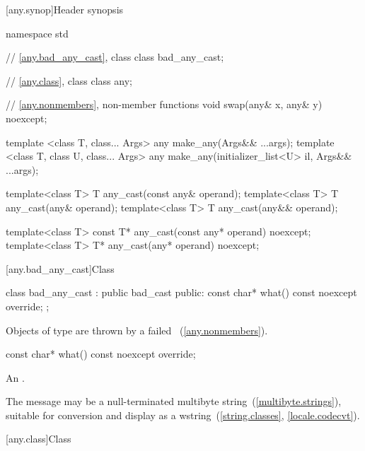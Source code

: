 [any.synop]{Header  synopsis}

%
%

\begin{codeblock}
namespace std {
  // \ref{any.bad_any_cast}, class 
  class bad_any_cast;

  // \ref{any.class}, class 
  class any;

  // \ref{any.nonmembers}, non-member functions
  void swap(any& x, any& y) noexcept;

  template <class T, class... Args>
    any make_any(Args&& ...args);
  template <class T, class U, class... Args>
    any make_any(initializer_list<U> il, Args&& ...args);

  template<class T>
    T any_cast(const any& operand);
  template<class T>
    T any_cast(any& operand);
  template<class T>
    T any_cast(any&& operand);

  template<class T>
    const T* any_cast(const any* operand) noexcept;
  template<class T>
    T* any_cast(any* operand) noexcept;
}
\end{codeblock}

[any.bad_any_cast]{Class }

%
\begin{codeblock}
class bad_any_cast : public bad_cast {
public:
  const char* what() const noexcept override;
};
\end{codeblock}

\pnum
Objects of type  are thrown by a failed ~(\ref{any.nonmembers}).

%
\begin{itemdecl}
const char* what() const noexcept override;
\end{itemdecl}

\begin{itemdescr}
\pnum
\returns An  \ntbs.

\pnum
\remarks
The message may be a null-terminated multibyte string~(\ref{multibyte.strings}),
suitable for conversion and display as a wstring~(\ref{string.classes}, \ref{locale.codecvt}).
\end{itemdescr}

[any.class]{Class }

